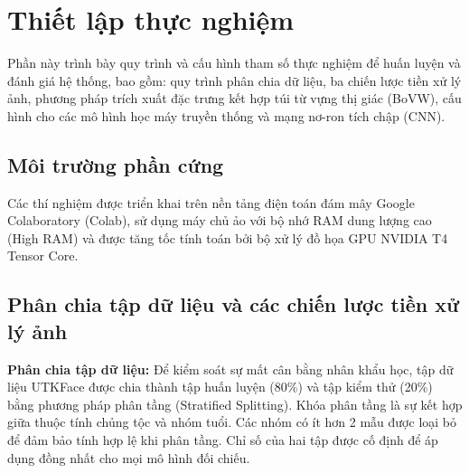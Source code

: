 
\section{Thiết lập thực nghiệm}

Phần này trình bày quy trình và cấu hình tham số thực nghiệm để huấn luyện và đánh giá hệ thống, bao gồm: quy trình phân chia dữ liệu, ba chiến lược tiền xử lý ảnh, phương pháp trích xuất đặc trưng kết hợp túi từ vựng thị giác (BoVW), cấu hình cho các mô hình học máy truyền thống và mạng nơ-ron tích chập (CNN).

\subsection{Môi trường phần cứng}
Các thí nghiệm được triển khai trên nền tảng điện toán đám mây Google Colaboratory (Colab), sử dụng máy chủ ảo với bộ nhớ RAM dung lượng cao (High RAM) và được tăng tốc tính toán bởi bộ xử lý đồ họa GPU NVIDIA T4 Tensor Core.

\subsection{Phân chia tập dữ liệu và các chiến lược tiền xử lý ảnh}
\textbf{Phân chia tập dữ liệu:} 
Để kiểm soát sự mất cân bằng nhân khẩu học, tập dữ liệu UTKFace được chia thành tập huấn luyện (80\%) và tập kiểm thử (20\%) bằng phương pháp phân tầng (Stratified Splitting). Khóa phân tầng là sự kết hợp giữa thuộc tính chủng tộc và nhóm tuổi. Các nhóm có ít hơn 2 mẫu được loại bỏ để đảm bảo tính hợp lệ khi phân tầng. Chỉ số của hai tập được cố định để áp dụng đồng nhất cho mọi mô hình đối chiếu.

